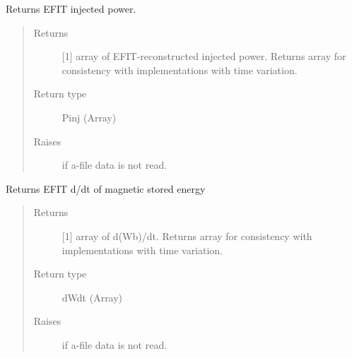 \documentclass[letterpaper,10pt,english]{sphinxmanual}
\begin{document}
\begin{fulllineitems}
\begin{fulllineitems}
\end{fulllineitems}


\begin{fulllineitems}
\label{\detokenize{eqtools:eqtools.eqdskreader.EqdskReader.getPinj}}
Returns EFIT injected power.
\begin{quote}\begin{description}
\item[{Returns}] \leavevmode
{[}1{]} array of EFIT-reconstructed injected power.
Returns array for consistency with
{\hyperref[\detokenize{eqtools:eqtools.core.Equilibrium}]{}}
implementations with time variation.

\item[{Return type}] \leavevmode
Pinj (Array)

\item[{Raises}] \leavevmode
{} \textendash{} if a-file data is not read.

\end{description}\end{quote}

\end{fulllineitems}


\begin{fulllineitems}
\label{\detokenize{eqtools:eqtools.eqdskreader.EqdskReader.getWbdot}}
Returns EFIT d/dt of magnetic stored energy
\begin{quote}\begin{description}
\item[{Returns}] \leavevmode
{[}1{]} array of d(Wb)/dt.  Returns array for consistency
with {\hyperref[\detokenize{eqtools:eqtools.core.Equilibrium}]{}}
implementations with time variation.

\item[{Return type}] \leavevmode
dWdt (Array)

\item[{Raises}] \leavevmode
{} \textendash{} if a-file data is not read.


\end{description}
\end{quote}
\end{fulllineitems}
\end{fulllineitems}
\end{document}
